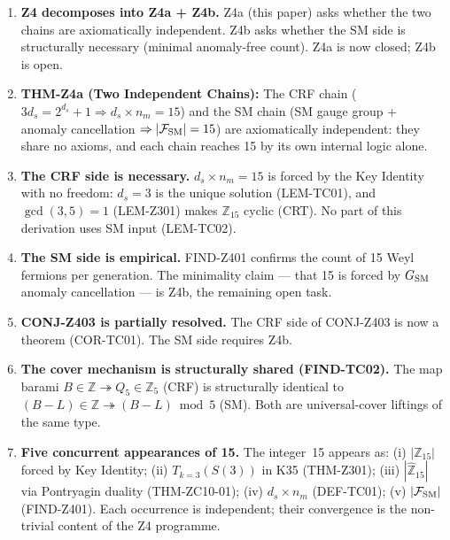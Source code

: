 \documentclass[12pt, a4paper]{article}
\begin{document}
\begin{enumerate}[leftmargin=*]

\item \textbf{Z4 decomposes into Z4a + Z4b.} Z4a (this paper) asks
  whether the two chains are axiomatically independent. Z4b asks
  whether the SM side is structurally necessary (minimal anomaly-free
  count). Z4a is now closed; Z4b is open.

\item \textbf{THM-Z4a (Two Independent Chains):} The CRF chain
  ($3d_s = 2^{d_s}+1 \Rightarrow d_s \times n_m = 15$) and the SM
  chain (SM gauge group + anomaly cancellation $\Rightarrow
  |\mathcal{F}_{\rm SM}| = 15$) are axiomatically independent: they
  share no axioms, and each chain reaches 15 by its own internal
  logic alone.

\item \textbf{The CRF side is necessary.} $d_s \times n_m = 15$ is
  forced by the Key Identity with no freedom: $d_s = 3$ is the unique
  solution (LEM-TC01), and $\gcd(3,5)=1$ (LEM-Z301) makes
  $\mathbb{Z}_{15}$ cyclic (CRT). No part of this derivation uses
  SM input (LEM-TC02).

\item \textbf{The SM side is empirical.} FIND-Z401 confirms the count
  of 15 Weyl fermions per generation. The minimality claim --- that 15
  is forced by $G_{\rm SM}$ anomaly cancellation --- is Z4b, the
  remaining open task.

\item \textbf{CONJ-Z403 is partially resolved.} The CRF side of
  CONJ-Z403 is now a theorem (COR-TC01). The SM side requires Z4b.

\item \textbf{The cover mechanism is structurally shared (FIND-TC02).}
  The map barami $B \in \mathbb{Z} \twoheadrightarrow Q_5 \in
  \mathbb{Z}_5$ (CRF) is structurally identical to $(B-L) \in
  \mathbb{Z} \twoheadrightarrow (B-L)\bmod 5$ (SM). Both are
  universal-cover liftings of the same type.

\item \textbf{Five concurrent appearances of 15.} The integer~15
  appears as: (i) $|\mathbb{Z}_{15}|$ forced by Key Identity; (ii)
  $T_{k=3}(S(3))$ in K35 (THM-Z301); (iii) $|\hat{\mathbb{Z}}_{15}|$
  via Pontryagin duality (THM-ZC10-01); (iv) $d_s \times n_m$
  (DEF-TC01); (v) $|\mathcal{F}_{\rm SM}|$ (FIND-Z401). Each
  occurrence is independent; their convergence is the non-trivial
  content of the Z4 programme.

\end{enumerate}
\end{document}
